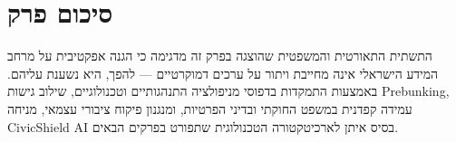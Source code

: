 \section{סיכום פרק}
\label{sec:theory_summary}

התשתית התאורטית והמשפטית שהוצגה בפרק זה מדגימה כי הגנה אפקטיבית על מרחב המידע הישראלי אינה מחייבת ויתור על ערכים דמוקרטיים --- להפך, היא נשענת עליהם. באמצעות התמקדות בדפוסי מניפולציה התנהגותיים וטכנולוגיים, שילוב גישות \textenglish{Prebunking}, עמידה קפדנית במשפט החוקתי ובדיני הפרטיות, ומנגנון פיקוח ציבורי עצמאי, מניחה \textenglish{CivicShield AI} בסיס איתן לארכיטקטורה הטכנולוגית שתפורט בפרקים הבאים.
